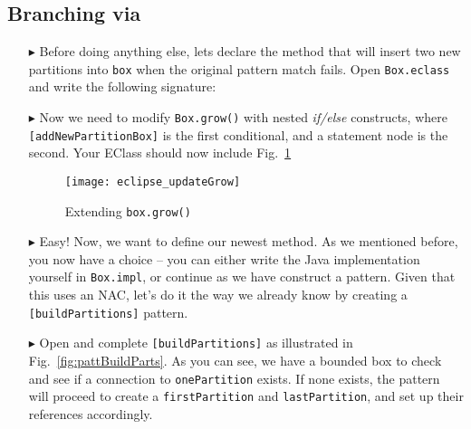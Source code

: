 \newpage
\hypertarget{conBran tex}{}
\subsection{Branching via}
\texHeader

\begin{itemize}

\item[$\blacktriangleright$] Before doing anything else, lets declare the method that will insert two new partitions into \texttt{box} when the original pattern
match fails. Open \texttt{Box.eclass} and write the following signature: 

\vspace{0.5cm}

\item[$\blacktriangleright$] Now we need to modify \texttt{Box.grow()} with nested \emph{if/else} constructs, where \texttt{[addNewPartitionBox]} is the first
conditional, and a statement node is the second. Your EClass should now include Fig.~\ref{fig:updateGrow}

\vspace{0.5cm}

\begin{figure}[htp]
\begin{center}
  \texttt{[image: eclipse\_updateGrow]}
  \caption{Extending \texttt{box.grow()}}
  \label{fig:updateGrow}
\end{center}
\end{figure}

\vspace{0.5cm}

\item[$\blacktriangleright$] Easy! Now, we want to define our newest method. As we mentioned before, you now have a choice -- you can either write the Java
implementation yourself in \texttt{Box.impl}, or continue as we have construct a pattern. Given that this uses an NAC, let's do it the way we already know by
creating a \texttt{[buildPartitions]} pattern.

\vspace{0.5cm}

\item[$\blacktriangleright$] Open and complete \texttt{[buildPartitions]} as illustrated in Fig.~\ref{fig:pattBuildParts}. As you can see, we have a bounded
box to check and see if a connection to \texttt{onePartition} exists. If none exists, the pattern will proceed to create a \texttt{firstPartition} and
\texttt{lastPartition}, and set up their references accordingly.


\end{itemize}
